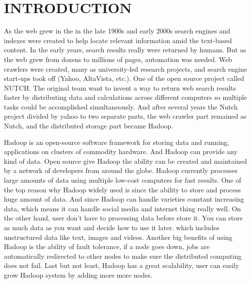 \section{INTRODUCTION}
\label{sect: introduction}

As the web grew in the in the late 1900s and early 2000s search engines and indexes were created to help locate relevant information amid the text-based content. In the early years, search results really were returned by humans. But as the web grew from dozens to millions of pages, automation was needed. Web crawlers were created, many as university-led research projects, and search engine start-ups took off (Yahoo, AltaVista, etc.). One of the open source project called NUTCH. The original team want to invent a way to return web search results faster by distributing data and calculations across different computers so multiple tasks could be accomplished simultaneously. And after several years the Nutch project divided by yahoo to two separate parts, the web crawler part remained as Nutch, and the distributed storage part became Hadoop.

Hadoop is an open-source software framework for storing data and running, applications on clusters of commodity hardware. And Hadoop can provide any kind of data. Open source give Hadoop the ability can be created and maintained by a network of developers from around the globe. Hadoop currently processes large amounts of data using multiple low-cost computers for fast results. One of the top reason why Hadoop widely used is since the ability to store and process huge amount of data. And since Hadoop can handle varieties constant increasing data, which means it can handle social media and internet thing really well. On the other hand, user don't have to processing data before store it. You can store as much data as you want and decide how to use it later. which includes unstructured data like text, images and videos. Another big benefits of using Hadoop is the ability of fault tolerance, if a node goes down, jobs are automatically redirected to other nodes to make sure the distributed computing does not fail. Last but not least, Hadoop has a great scalability, user can easily grow Hadoop system by adding more more nodes.

